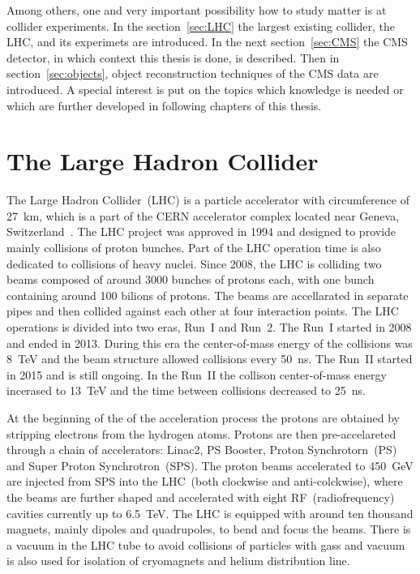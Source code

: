 \clearpage

\setcounter{secnumdepth}{4}
\setcounter{secnumdepth}{5}

Among others, one and very important possibility how to study matter is at collider experiments. In the section~\ref{sec:LHC} the largest existing collider, the LHC, and its experimets are introduced. In the next section~\ref{sec:CMS} the CMS detector, in which context this thesis is done, is described. Then in section~\ref{sec:objects}, object reconstruction techniques of the CMS data are introduced. A special interest is put on the topics which knowledge is needed or which are further developed in following chapters of this thesis.

\section{The Large Hadron Collider~\label{sec:LHC}}

The Large Hadron Collider~(LHC) is a particle accelerator with circumference of 27~km, which is a part of the CERN accelerator complex located near Geneva, Switzerland~\cite{CERN-Brochure-2017-002-Eng, Evans:2008zzb}. The LHC project was approved in 1994 and designed to provide mainly collisions of proton bunches. Part of the LHC operation time is also dedicated to collisions of heavy nuclei. Since 2008, the LHC is colliding two beams composed of around 3000 bunches of protons each, with one bunch containing around 100 bilions of protons. The beams are accellarated in separate pipes and then collided against each other at four interaction points. The LHC operations is divided into two eras, Run~I and Run~2. The Run~I started in 2008 and ended in 2013. During this era the center-of-mass energy of the collisions was 8~TeV and the beam structure allowed collisions every 50~ns. The Run~II started in 2015 and is still ongoing. In the Run~II the collison center-of-mass energy incerased to 13~TeV and the time between collisions decreased to 25~ns.

At the beginning of the of the acceleration process the protons are obtained by stripping electrons from the hydrogen atoms. Protons are then pre-accelareted through a chain of accelerators: Linac2, PS Booster, Proton Synchrotorn~(PS) and Super Proton Synchrotron~(SPS). The proton beams accelerated to 450~GeV are injected from SPS into the LHC~(both clockwise and anti-colckwise), where the beams are further shaped and accelerated with eight RF~(radiofrequency) cavities currently up to 6.5~TeV. The LHC is equipped with around ten thousand magnets, mainly dipoles and quadrupoles, to bend and focus the beams. There is a vacuum in the LHC tube to avoid collisions of particles with gass and vacuum is also used for isolation of cryomagnets and helium distribution line.

